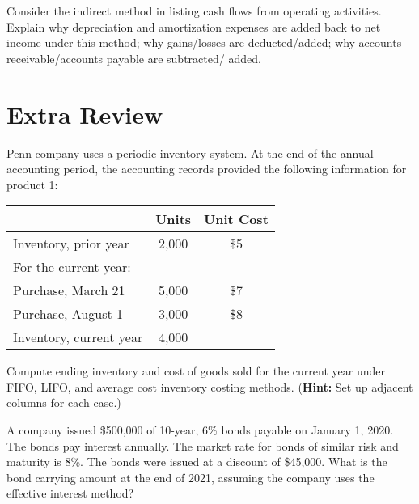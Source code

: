 \documentclass{scrartcl}
\begin{document}
\vspace{10em}

Consider the indirect method in listing cash flows from operating
activities. Explain why depreciation and amortization expenses are 
added back to net income under this method; why gains/losses are
deducted/added; why accounts receivable/accounts payable are subtracted/%
added.

\vspace{10em}

\newpage

\section{Extra Review}

Penn company uses a periodic inventory system. 
At the end of the annual accounting period,
the accounting records provided the following information for product 1:

\begin{center}
\begin{tabular}{|lcc|} \hline
     & Units & Unit Cost \\ \hline
    Inventory, prior year & 2,000 & \$5 \\
    For the current year: & & \\ 
    \hspace{1.5em} Purchase, March 21 & 5,000 & \$7 \\ 
    \hspace{1.5em} Purchase, August 1 & 3,000 & \$8 \\
    Inventory, current year & 4,000 & \\ \hline
    
\end{tabular}
\end{center}

Compute ending inventory and cost of goods sold for the current year
under FIFO, LIFO, and average cost inventory costing methods.
(\textbf{Hint:} Set up adjacent columns for each case.)

\vspace{10em}

A company issued \$500,000 of 10-year, 6\% bonds payable 
on January 1, 2020.
The bonds pay interest annually.
The market rate for bonds of similar risk and maturity is 8\%.
The bonds were issued at a discount of \$45,000. 
What is the bond carrying amount at the end of 2021, 
assuming the company uses the effective interest method?

\vspace{10em}
\end{document}
